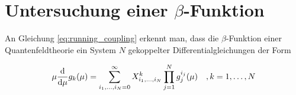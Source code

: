 \section{Untersuchung einer $\beta$-Funktion}


  An Gleichung \ref{eq:running_coupling} erkennt man, dass die $\beta$-Funktion einer 
  Quantenfeldtheorie ein System $N$ gekoppelter Differentialgleichungen der Form 
  
  \begin{equation}
   \mu \frac{\text{d}}{\text{d} \mu} g_k (\mu)  = \sum\limits_{i_1,\ldots,i_N=0}^\infty X^k_{i_1,\ldots,i_N}
		  \prod\limits_{j=1}^N  g_j^{i_j}(\mu) \quad , k=1,\ldots,N
  \end{equation}

  
  
  
  
  
